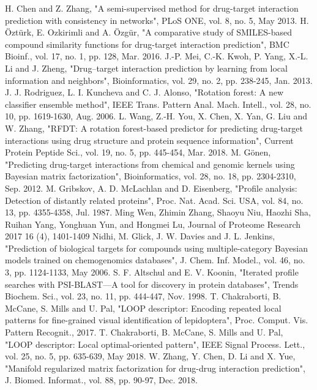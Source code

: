 \documentclass[conference]{IEEEtran}
\begin{document}
\begin{thebibliography}{00}
H. Chen and Z. Zhang, "A semi-supervised method for drug-target interaction prediction with consistency in networks", PLoS ONE, vol. 8, no. 5, May 2013.
H. Öztürk, E. Ozkirimli and A. Özgür, "A comparative study of SMILES-based compound similarity functions for drug-target interaction prediction", BMC Bioinf., vol. 17, no. 1, pp. 128, Mar. 2016.
 J.-P. Mei, C.-K. Kwoh, P. Yang, X.-L. Li and J. Zheng, "Drug–target interaction prediction by learning from local information and neighbors", Bioinformatics, vol. 29, no. 2, pp. 238-245, Jan. 2013.
 J. J. Rodriguez, L. I. Kuncheva and C. J. Alonso, "Rotation forest: A new classifier ensemble method", IEEE Trans. Pattern Anal. Mach. Intell., vol. 28, no. 10, pp. 1619-1630, Aug. 2006.
L. Wang, Z.-H. You, X. Chen, X. Yan, G. Liu and W. Zhang, "RFDT: A rotation forest-based predictor for predicting drug-target interactions using drug structure and protein sequence information", Current Protein Peptide Sci., vol. 19, no. 5, pp. 445-454, Mar. 2018.
M. Gönen, "Predicting drug-target interactions from chemical and genomic kernels using Bayesian matrix factorization", Bioinformatics, vol. 28, no. 18, pp. 2304-2310, Sep. 2012.
 M. Gribskov, A. D. McLachlan and D. Eisenberg, "Profile analysis: Detection of distantly related proteins", Proc. Nat. Acad. Sci. USA, vol. 84, no. 13, pp. 4355-4358, Jul. 1987.
 Ming Wen, Zhimin Zhang, Shaoyu Niu, Haozhi Sha, Ruihan Yang, Yonghuan Yun, and Hongmei Lu, Journal of Proteome Research 2017 16 (4), 1401-1409
Nidhi, M. Glick, J. W. Davies and J. L. Jenkins, "Prediction of biological targets for compounds using multiple-category Bayesian models trained on chemogenomics databases", J. Chem. Inf. Model., vol. 46, no. 3, pp. 1124-1133, May 2006.
S. F. Altschul and E. V. Koonin, "Iterated profile searches with PSI-BLAST—A tool for discovery in protein databases", Trends Biochem. Sci., vol. 23, no. 11, pp. 444-447, Nov. 1998.
 T. Chakraborti, B. McCane, S. Mills and U. Pal, "LOOP descriptor: Encoding repeated local patterns for fine-grained visual identification of lepidoptera", Proc. Comput. Vis. Pattern Recognit., 2017.
 T. Chakraborti, B. McCane, S. Mills and U. Pal, "LOOP descriptor: Local optimal-oriented pattern", IEEE Signal Process. Lett., vol. 25, no. 5, pp. 635-639, May 2018.
W. Zhang, Y. Chen, D. Li and X. Yue, "Manifold regularized matrix factorization for drug-drug interaction prediction", J. Biomed. Informat., vol. 88, pp. 90-97, Dec. 2018.

\end{thebibliography}
\end{document}
